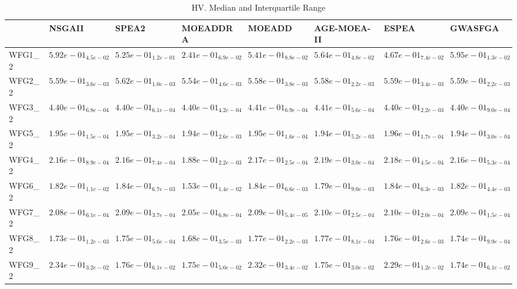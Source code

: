 \documentclass{article}
\begin{document}
\begin{landscape}
\begin{table}
\caption{HV. Median and Interquartile Range}
\label{table: HV}
\centering
\begin{scriptsize}
\begin{tabular}{llllllll}
\hline & NSGAII & SPEA2 & MOEADDRA & MOEADD & AGE-MOEA-II & ESPEA &  GWASFGA\\
\hline 
WFG1\_2 & \cellcolor{gray25}$  5.92e-01_{ 4.5e-02}$ & $  5.25e-01_{ 1.2e-01}$ & $  2.41e-01_{ 6.9e-02}$ & $  5.41e-01_{ 8.8e-02}$ & $  5.64e-01_{ 4.8e-02}$ & $  4.67e-01_{ 7.4e-02}$ & \cellcolor{gray95}$  5.95e-01_{ 1.3e-02}$ \\
WFG2\_2 & $  5.59e-01_{ 3.6e-03}$ & \cellcolor{gray95}$  5.62e-01_{ 1.0e-03}$ & $  5.54e-01_{ 4.6e-03}$ & $  5.58e-01_{ 3.8e-03}$ & $  5.58e-01_{ 2.2e-03}$ & \cellcolor{gray25}$  5.59e-01_{ 3.4e-03}$ & $  5.59e-01_{ 2.2e-03}$ \\
WFG3\_2 & $  4.40e-01_{ 6.8e-04}$ & $  4.40e-01_{ 6.1e-04}$ & $  4.40e-01_{ 4.2e-04}$ & \cellcolor{gray25}$  4.41e-01_{ 6.9e-04}$ & \cellcolor{gray95}$  4.41e-01_{ 5.6e-04}$ & $  4.40e-01_{ 2.2e-03}$ & $  4.40e-01_{ 9.0e-04}$ \\
WFG5\_2 & $  1.95e-01_{ 1.5e-04}$ & \cellcolor{gray25}$  1.95e-01_{ 3.2e-04}$ & $  1.94e-01_{ 2.6e-03}$ & $  1.95e-01_{ 1.6e-04}$ & $  1.94e-01_{ 5.2e-03}$ & \cellcolor{gray95}$  1.96e-01_{ 1.7e-04}$ & $  1.94e-01_{ 3.0e-04}$ \\
WFG4\_2 & $  2.16e-01_{ 8.9e-04}$ & $  2.16e-01_{ 7.4e-04}$ & $  1.88e-01_{ 2.2e-03}$ & $  2.17e-01_{ 2.5e-04}$ & \cellcolor{gray95}$  2.19e-01_{ 3.0e-04}$ & \cellcolor{gray25}$  2.18e-01_{ 4.5e-04}$ & $  2.16e-01_{ 5.3e-04}$ \\
WFG6\_2 & $  1.82e-01_{ 1.1e-02}$ & \cellcolor{gray95}$  1.84e-01_{ 6.7e-03}$ & $  1.53e-01_{ 1.4e-02}$ & \cellcolor{gray25}$  1.84e-01_{ 6.6e-03}$ & $  1.79e-01_{ 9.0e-03}$ & $  1.84e-01_{ 6.3e-03}$ & $  1.82e-01_{ 4.4e-03}$ \\
WFG7\_2 & $  2.08e-01_{ 6.1e-04}$ & $  2.09e-01_{ 3.7e-04}$ & $  2.05e-01_{ 6.8e-04}$ & $  2.09e-01_{ 5.4e-05}$ & \cellcolor{gray95}$  2.10e-01_{ 2.5e-04}$ & \cellcolor{gray25}$  2.10e-01_{ 2.0e-04}$ & $  2.09e-01_{ 1.5e-04}$ \\
WFG8\_2 & $  1.73e-01_{ 1.2e-03}$ & $  1.75e-01_{ 5.6e-04}$ & $  1.68e-01_{ 3.5e-03}$ & \cellcolor{gray25}$  1.77e-01_{ 2.2e-03}$ & \cellcolor{gray95}$  1.77e-01_{ 8.1e-04}$ & $  1.76e-01_{ 2.6e-03}$ & $  1.74e-01_{ 9.9e-04}$ \\
WFG9\_2 & \cellcolor{gray95}$  2.34e-01_{ 3.2e-02}$ & $  1.76e-01_{ 6.1e-02}$ & $  1.75e-01_{ 5.0e-02}$ & \cellcolor{gray25}$  2.32e-01_{ 3.4e-02}$ & $  1.75e-01_{ 3.0e-02}$ & $  2.29e-01_{ 1.2e-02}$ & $  1.74e-01_{ 6.1e-02}$ \\

\end{tabular}
\end{scriptsize}
\end{table}
\end{landscape}
\end{document}
